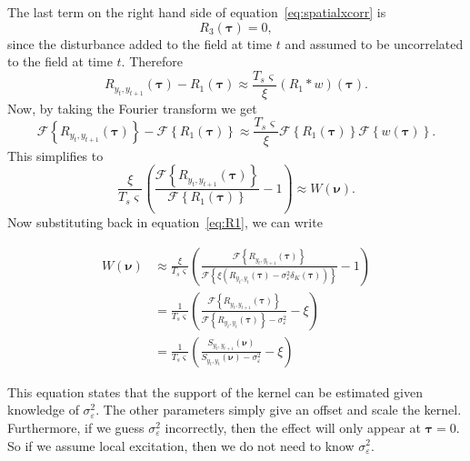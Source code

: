 \documentclass[]{article}
\begin{document}
The last term on the right hand side of equation~\ref{eq:spatialxcorr} is
\begin{equation}
	R_3(\boldsymbol{\tau}) = 0,
\end{equation}
since the disturbance added to the field at time $t$ and assumed to be uncorrelated to the field at time $t$. Therefore 
\begin{equation}
	R_{y_{t},y_{t+1}}(\boldsymbol{\tau}) - R_1(\boldsymbol{\tau}) \approx \frac{T_s \varsigma}{\xi} \left(R_1 \ast w\right)\left(\boldsymbol{\tau}\right).
\end{equation}
Now, by taking the Fourier transform we get
\begin{equation}
	\mathcal{F}\left\{R_{y_{t},y_{t+1}}(\boldsymbol{\tau})\right\} - \mathcal{F}\left\{R_1(\boldsymbol{\tau})\right\} \approx \frac{T_s \varsigma}{\xi} \mathcal{F}\left\{R_1(\boldsymbol{\tau})\right\} \mathcal{F}\left\{ w\left(\boldsymbol{\tau}\right)\right\}.
\end{equation}
This simplifies to
\begin{equation}
	\frac{\xi}{T_s \varsigma} \left(\frac{\mathcal{F}\left\{R_{y_{t},y_{t+1}}(\boldsymbol{\tau})\right\}}{\mathcal{F}\left\{R_1(\boldsymbol{\tau})\right\}} - 1\right) \approx  W\left(\boldsymbol{\nu}\right).
\end{equation}
Now substituting back in equation~\ref{eq:R1}, we can write

\begin{align}
	W\left(\boldsymbol{\nu}\right) &\approx \frac{\xi}{T_s \varsigma} \left(\frac{\mathcal{F}\left\{R_{y_{t},y_{t+1}}(\boldsymbol{\tau})\right\}}{\mathcal{F}\left\{\xi\left( R_{y_{t},y_{t}}(\boldsymbol{\tau}) - \sigma_{\varepsilon}^2\delta_K\left(\boldsymbol{\tau}\right) \right)\right\}} - 1\right)  \\
	&= \frac{1}{T_s \varsigma} \left(\frac{\mathcal{F}\left\{R_{y_{t},y_{t+1}}(\boldsymbol{\tau})\right\}}{\mathcal{F}\left\{ R_{y_{t},y_{t}}(\boldsymbol{\tau})\right\} - \sigma_{\varepsilon}^2 } - \xi\right) \\
	&= \frac{1}{T_s \varsigma} \left(\frac{S_{y_{t},y_{t+1}}\left(\boldsymbol{\nu}\right)}{S_{y_{t},y_{t}}\left(\boldsymbol{\nu}\right) - \sigma_{\varepsilon}^2 } - \xi\right)
\end{align}

This equation states that the support of the kernel can be estimated given knowledge of $\sigma_\varepsilon^2$. The other parameters simply give an offset and scale the kernel. Furthermore, if we guess $\sigma_\varepsilon^2$ incorrectly, then the effect will only appear at $\boldsymbol{\tau}=0$. So if we assume local excitation, then we do not need to know $\sigma_\varepsilon^2$.
\end{document}
